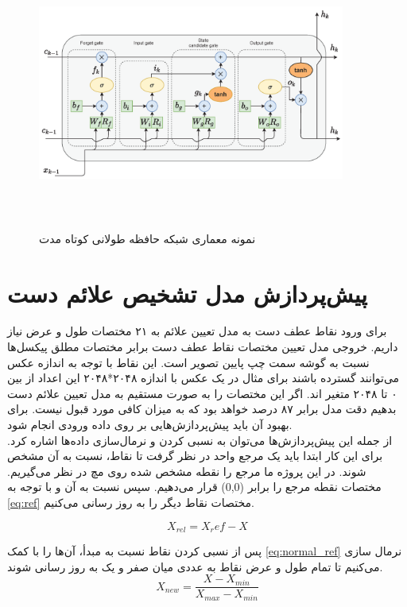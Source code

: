 \begin{figure}[h]
    \centering
    \includegraphics[height=9cm,width=0.9\textwidth]{LSTM.png}
    \caption[نمونه معماری شبکه‌ حافظه طولانی کوتاه مدت]{نمونه معماری شبکه‌ حافظه طولانی کوتاه مدت \cite{s21165625}}
\end{figure}




\section{پیش‌پردازش مدل تشخیص علائم دست}
برای ورود نقاط عطف دست به مدل تعیین علائم به ۲۱ مختصات طول و عرض نیاز داریم. خروجی مدل تعیین مختصات نقاط عطف دست برابر مختصات مطلق پیکسل‌ها نسبت به گوشه سمت 
چپ پایین تصویر است. این نقاط با توجه به اندازه عکس می‌توانند گسترده باشند برای مثال در یک عکس با اندازه ۲۰۴۸*۲۰۴۸ این اعداد از بین ۰ تا ۲۰۴۸ متغیر اند. 
اگر این مختصات را به صورت مستقیم به مدل تعیین علائم دست بدهیم دقت مدل برابر ۸۷ درصد خواهد بود که به میزان کافی مورد قبول نیست. برای بهبود آن باید پیش‌پردازش‌هایی بر روی داده ورودی انجام شود. 
\\
از جمله این پیش‌پردازش‌ها می‌توان به نسبی کردن و نرمال‌سازی داده‌ها اشاره کرد. برای این کار ابتدا باید یک مرجع واحد در نظر گرفت تا نقاط، نسبت به آن مشخص شوند. در این پروژه ما مرجع را نقطه 
مشخص شده روی مچ در نظر می‌گیریم. مختصات نقطه مرجع را برابر (0,0)  قرار می‌دهیم. سپس نسبت به آن و با توجه به
\cref{eq:ref}
مختصات نقاط دیگر را به روز رسانی می‌کنیم.

\begin{equation}\label{eq:ref}
    X_{rel} = X_ref -X
\end{equation}


پس از نسبی کردن نقاط نسبت به مبدأ، آن‌ها را با کمک 
\cref{eq:normal_ref}
نرمال سازی می‌کنیم تا تمام طول و عرض نقاط به عددی میان صفر و یک به روز رسانی شوند.
\begin{equation}\label{eq:normal_ref}
    X_{new} = \frac{X - X_{min}}{X_{max} - X_{min}}
\end{equation}

